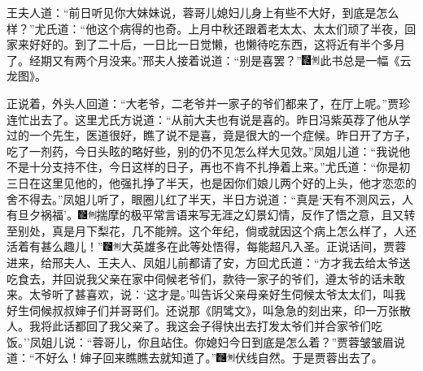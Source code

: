 王夫人道：``前日听见你大妹妹说，蓉哥儿媳妇儿身上有些不大好，到底是怎么样？''尤氏道：``他这个病得的也奇。上月中秋还跟着老太太、太太们顽了半夜，回家来好好的。到了二十后，一日比一日觉懒，也懒待吃东西，这将近有半个多月了。经期又有两个月没来。''邢夫人接着说道：``别是喜罢？''{\includegraphics[width=3mm]{../Images/00006}\includegraphics[width=3mm]{../Images/00011}\footnotesize \kaishu 此书总是一幅《云龙图》。}

正说着，外头人回道：``大老爷，二老爷并一家子的爷们都来了，在厅上呢。''贾珍连忙出去了。这里尤氏方说道：``从前大夫也有说是喜的。昨日冯紫英荐了他从学过的一个先生，医道很好，瞧了说不是喜，竟是很大的一个症候。昨日开了方子，吃了一剂药，今日头眩的略好些，别的仍不见怎么样大见效。''凤姐儿道：``我说他不是十分支持不住，今日这样的日子，再也不肯不扎挣着上来。''尤氏道：``你是初三日在这里见他的，他强扎挣了半天，也是因你们娘儿两个好的上头，他才恋恋的舍不得去。''凤姐儿听了，眼圈儿红了半天，半日方说道：``真是`天有不测风云，人有旦夕祸福'。{\includegraphics[width=3mm]{../Images/00006}\includegraphics[width=3mm]{../Images/00011}\footnotesize \kaishu 揣摩的极平常言语来写无涯之幻景幻情，反作了悟之意，且又转至别处，真是月下梨花，几不能辨。}这个年纪，倘或就因这个病上怎么样了，人还活着有甚么趣儿！''{\includegraphics[width=3mm]{../Images/00006}\includegraphics[width=3mm]{../Images/00011}\footnotesize \kaishu 大英雄多在此等处悟得，每能超凡入圣。}正说话间，贾蓉进来，给邢夫人、王夫人、凤姐儿前都请了安，方回尤氏道：``方才我去给太爷送吃食去，并回说我父亲在家中伺候老爷们，款待一家子的爷们，遵太爷的话未敢来。太爷听了甚喜欢，说：`这才是。'叫告诉父亲母亲好生伺候太爷太太们，叫我好生伺候叔叔婶子们并哥哥们。还说那《阴骘文》，叫急急的刻出来，印一万张散人。我将此话都回了我父亲了。我这会子得快出去打发太爷们并合家爷们吃饭。''凤姐儿说：``蓉哥儿，你且站住。你媳妇今日到底是怎么着？''贾蓉皱皱眉说道：``不好么！婶子回来瞧瞧去就知道了。''{\includegraphics[width=3mm]{../Images/00006}\includegraphics[width=3mm]{../Images/00011}\footnotesize \kaishu 伏线自然。}于是贾蓉出去了。

